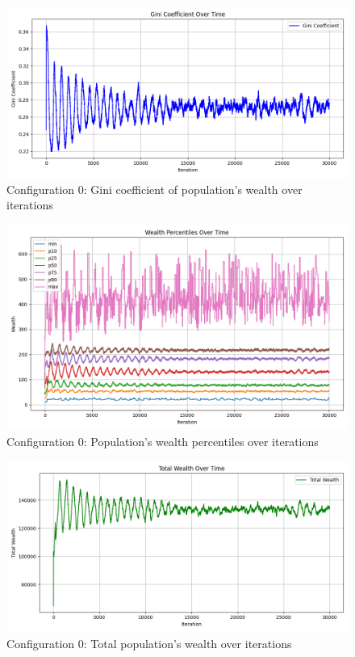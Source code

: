 \documentclass[english]{projectreport}
\begin{document}
    \begin{figure}[H]
        \centering
        \includegraphics[width=0.8\linewidth]{metrics_config0/metrics_config0_gini_coefficient.png}
        \caption{Configuration 0: Gini coefficient of population's wealth over iterations}
        \label{fig:c0-gini_coefficient}
    \end{figure}

    \begin{figure}[H]
        \centering
        \includegraphics[width=0.8\linewidth]{metrics_config0/metrics_config0_wealth_perc_time.png}
        \caption{Configuration 0: Population's wealth percentiles over iterations}
        \label{fig:c0-wealth_perc_time}
    \end{figure}

    \begin{figure}[H]
        \centering
        \includegraphics[width=0.8\linewidth]{metrics_config0/metrics_config0_total_wealth.png}
        \caption{Configuration 0: Total population's wealth over iterations}
        \label{fig:c0-total_wealth}
    \end{figure}
\end{document}

